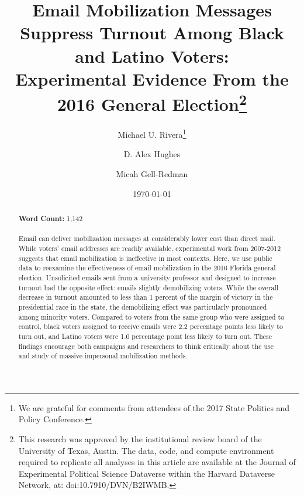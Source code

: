 \documentclass[12pt]{article}
\begin{document}
\author[1]{Michael U. Rivera\thanks{We are grateful for comments from
    attendees of the 2017 State Politics and Policy Conference.}}
\author[1]{D. Alex Hughes} \author[2,3]{Micah Gell-Redman}

\renewcommand\Authands{ and }

\title{Email Mobilization Messages Suppress Turnout Among Black and Latino Voters:\\
  Experimental Evidence From the 2016 General Election\thanks{This
    research was approved by the institutional review board of the
    University of Texas, Austin.  The data, code, and compute
    environment required to replicate all analyses in this article are
    available at the Journal of Experimental Political Science
    Dataverse within the Harvard Dataverse Network, at:
    doi:10.7910/DVN/B2IWMB.}}  \date{\today}


\maketitle
\thispagestyle{empty}

\begin{abstract}
  \noindent \textbf{Word Count:}  1,142 \\ \\
  Email can deliver mobilization messages at considerably lower cost
  than direct mail. While voters’ email addresses are readily
  available, experimental work from 2007-2012 suggests that email
  mobilization is ineffective in most contexts. Here, we use public
  data to reexamine the effectiveness of email mobilization in the
  2016 Florida general election. Unsolicited emails sent from a
  university professor and designed to increase turnout had the
  opposite effect: emails slightly demobilizing voters. While the
  overall decrease in turnout amounted to less than 1 percent of the
  margin of victory in the presidential race in the state, the
  demobilizing effect was particularly pronounced among minority
  voters. Compared to voters from the same group who were assigned to
  control, black voters assigned to receive emails were 2.2 percentage
  points less likely to turn out, and Latino voters were 1.0
  percentage point less likely to turn out. These findings encourage
  both campaigns and researchers to think critically about the use and
  study of massive impersonal mobilization methods.

\end{abstract}
\end{document}
